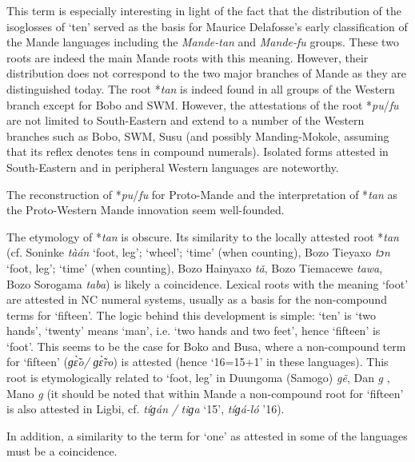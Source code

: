 This term is especially interesting in light of the fact that the distribution of the isoglosses of ‘ten’ served as the basis for Maurice Delafosse’s early classification of the Mande languages including the \textit{Mande-tan} and \textit{Mande-fu} groups. These two roots are indeed the main Mande roots with this meaning. However, their distribution does not correspond to the two major branches of Mande as they are distinguished today. The root *\textit{tan} is indeed found in all groups of the Western branch except for Bobo and SWM. However, the attestations of the root *\textit{pu}/\textit{fu} are not limited to South-Eastern and extend to a number of the Western branches such as Bobo, SWM, Susu (and possibly Manding-Mokole, assuming that its reflex denotes tens in compound numerals). Isolated forms attested in South-Eastern and in peripheral Western languages are noteworthy.

The reconstruction of *\textit{pu}/\textit{fu} for Proto-Mande and the interpretation of *\textit{tan} as the Proto-Western Mande innovation seem well-founded. 

The etymology of *\textit{tan} is obscure. Its similarity to the locally attested root *\textit{tan} (cf. Soninke \textit{tàán} ‘foot, leg’; ‘wheel’; `time’ (when counting), Bozo Tieyaxo \textit{tɔn} ‘foot, leg’; ‘time’ (when counting), Bozo Hainyaxo \textit{t{\v{a}}}, Bozo Tiemacewe \textit{tawa}, Bozo Sorogama \textit{taba}) is likely a coincidence. Lexical roots with the meaning ‘foot’ are attested in NC numeral systems, usually as a basis for the non-compound terms for ‘fifteen’. The logic behind this development is simple: ‘ten’ is ‘two hands’, ‘twenty’ means ‘man’, i.e. ‘two hands and two feet’, hence ‘fifteen’ is ‘foot’. This seems to be the case for Boko and Busa, where a non-compound term for ‘fifteen’ (\textit{ɡ{\`{\~ɛ}}o/} \textit{ɡ{\`{\~ɛ}}ro}) is attested (hence ‘16=15+1’ in these languages). This root is etymologically related to ‘foot, leg’ in Duungoma (Samogo) \textit{g{\~{e}}}, Dan \textit{g{}} , Mano \textit{g{}} (it should be noted that within Mande a non-compound root for ‘fifteen’ is also attested in Ligbi, cf. \textit{tíɡán} \textit{/} \textit{tiɡa} ‘15’, \textit{tíɡá-ló} ’16).

In addition, a similarity to the term for ‘one’ as attested in some of the languages must be a coincidence.

